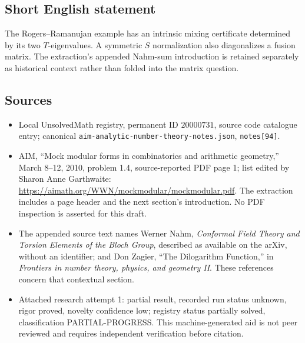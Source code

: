 \documentclass[11pt]{article}
\begin{document}
\subsection{Short English statement}
The Rogers--Ramanujan example has an intrinsic mixing certificate determined by its two $T$-eigenvalues. A symmetric $S$ normalization also diagonalizes a fusion matrix. The extraction's appended Nahm-sum introduction is retained separately as historical context rather than folded into the matrix question.
\subsection{Sources}
\begin{itemize}
\item Local UnsolvedMath registry, permanent ID $20000731$, source code catalogue entry; canonical \texttt{aim-analytic-number-theory-notes.json}, \texttt{notes[94]}.
\item AIM, ``Mock modular forms in combinatorics and arithmetic geometry,'' March 8--12, 2010, problem 1.4, source-reported PDF page 1; list edited by Sharon Anne Garthwaite: \url{https://aimath.org/WWN/mockmodular/mockmodular.pdf}. The extraction includes a page header and the next section's introduction. No PDF inspection is asserted for this draft.
\item The appended source text names Werner Nahm, \emph{Conformal Field Theory and Torsion Elements of the Bloch Group}, described as available on the arXiv, without an identifier; and Don Zagier, ``The Dilogarithm Function,'' in \emph{Frontiers in number theory, physics, and geometry II}. These references concern that contextual section.
\item Attached research attempt 1: partial result, recorded run status unknown, rigor proved, novelty confidence low; registry status partially solved, classification PARTIAL-PROGRESS. This machine-generated aid is not peer reviewed and requires independent verification before citation.
\end{itemize}
\end{document}

